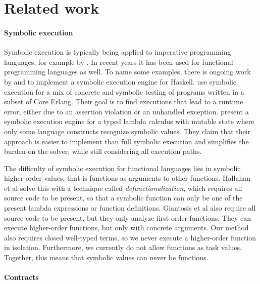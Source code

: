 


\section{Related work}
\label{sec:relatedwork}

\paragraph{Symbolic execution}
Symbolic execution \cite{King1975,Boyer1975} is typically being applied to imperative programming languages, for example by \citet{BucurKC2014, CadarDE2008, JaffarMNS2012}.
In recent years it has been used for functional programming languages as well.
To name some examples, there is ongoing work by \citet{HallahanXP2017} and \citet{Xue2019} to implement a symbolic execution engine for Haskell.
\citet{GiantsiosPS2017} use symbolic execution for a mix of concrete and symbolic testing of programs written in a subset of Core Erlang.
Their goal is to find executions that lead to a runtime error, either due to an assertion violation or an unhandled exception.
\citet{ChangKT2018} present a symbolic execution engine for a typed lambda calculus with mutable state where only some language constructs recognize symbolic values.
They claim that their approach is easier to implement than full symbolic execution and simplifies the burden on the solver, while still considering all execution paths.

The difficulty of symbolic execution for functional languages lies in symbolic higher-order values, that is functions as arguments to other functions.
Hallahan et al solve this with a technique called \emph{defunctionalization}, which requires all source code to be present, so that a symbolic function can only be one of the present lambda expressions or function definitions.
Giantosis et al also require all source code to be present, but they only analyze first-order functions.
They can execute higher-order functions, but only with concrete arguments.
Our method also requires closed well-typed terms, so we never execute a higher-order function in isolation.
Furthermore, we currently do not allow functions as task values.
Together, this means that symbolic values can never be functions.



\paragraph{Contracts}


